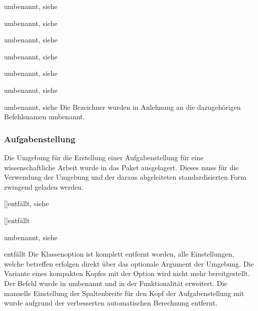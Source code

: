 \documentclass[%
  english,ngerman,%
  headings=optiontoheadandtoc,captions=tableheading,numbers=noenddot,%
  chapterpage,cdfoot,%
]{tudscrman}
\begin{document}
\begin{Declaration}{}{umbenannt, siehe }
\begin{Declaration}{}{%
  umbenannt, siehe %
}
\begin{Declaration}{}{%
  umbenannt, siehe %
}
\begin{Declaration}{}{%
  umbenannt, siehe %
}
\begin{Declaration}{}{%
  umbenannt, siehe %
}
\begin{Declaration}{}{%
  umbenannt, siehe %
}
\begin{Declaration}{}{umbenannt, siehe }
\printdeclarationlist*%
%
Die Bezeichner wurden in Anlehnung an die dazugehörigen Befehlsnamen umbenannt.
\end{Declaration}
\end{Declaration}
\end{Declaration}
\end{Declaration}
\end{Declaration}
\end{Declaration}
\end{Declaration}

\subsubsection{Aufgabenstellung}
Die Umgebung für die Erstellung einer Aufgabenstellung für eine 
wissenschaftliche Arbeit wurde in das Paket  
ausgelagert. Dieses muss für die Verwendung der Umgebung  und 
der daraus abgeleiteten standardisierten Form zwingend geladen werden.

\begin{Declaration}{[\PSet]}{entfällt, siehe }
\begin{Declaration}{[\PBoolean]}{entfällt}
\begin{Declaration}{}{%
  umbenannt, siehe %
}
\begin{Declaration}{}{entfällt}
\printdeclarationlist*%
%
Die Klassenoption  ist komplett entfernt worden, alle 
Einstellungen, welche  betreffen erfolgen direkt über das 
optionale Argument der Umgebung. Die Variante eines kompakten Kopfes mit der 
Option  wird nicht mehr bereitgestellt. Der Befehl 
 wurde in  umbenannt und in der Funktionalität 
erweitert. Die manuelle Einstellung der Spaltenbreite für den Kopf der 
Aufgabenstellung mit  wurde aufgrund der verbesserten 
automatischen Berechnung entfernt.
\end{Declaration}
\end{Declaration}
\end{Declaration}
\end{Declaration}
\end{document}
